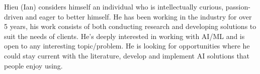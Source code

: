 Hieu (Ian) considers himself an individual who is intellectually curious, passion-driven and eager
to better himself. He has been working in the industry for over 5 years, his work consists of both
conducting research and developing solutions to suit the needs of clients. He's deeply interested in
working with AI/ML and is open to any interesting topic/problem. He is looking for opportunities
where he could stay current with the literature, develop and implement AI solutions that people
enjoy using.

